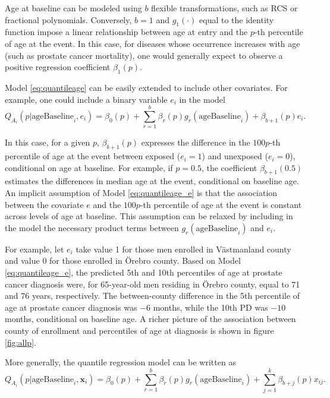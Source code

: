 Age at baseline can be modeled using $b$ flexible transformations, such as RCS or fractional polynomials. Conversely, $b=1$ and $g_1(\cdot)$ equal to the identity function impose a linear relationship between age at entry and the $p$-th percentile of age at the event. In this case, for diseases whose occurrence increases with age (such as prostate cancer mortality), one would generally expect to observe a positive regression coefficient $\beta_1(p)$.

Model \ref{eq:quantileage} can be easily extended to include other covariates. For example, one could include a binary variable $e_i$ in the model
\begin{equation}
Q_{A_i}(p|\textrm{ageBaseline}_i, e_i) = \beta_0(p) + \sum_{r=1}^b \beta_r(p)g_r(\textrm{ageBaseline}_i) + \beta_{b+1}(p)e_i.
\label{eq:quantileage_e}
\end{equation}

In this case, for a given $p$, $\beta_{b+1}(p)$ expresses the difference in the $100p$-th percentile of age at the event between exposed ($e_i=1$) and unexposed ($e_i=0$), conditional on age at baseline. For example, if $p=0.5$, the coefficient $\beta_{b+1}(0.5)$ estimates the differences in median age at the event, conditional on baseline age. An implicit assumption of Model \ref{eq:quantileage_e} is that the association between the covariate $e$ and the $100p$-th percentile of age at the event is constant across levels of age at baseline. This assumption can be relaxed by including in the model the necessary product terms between $g_r(\textrm{ageBaseline}_i)$ and $e_i$.

For example, let $e_i$ take value 1 for those men enrolled in Västmanland county and value 0 for those enrolled in Örebro county. Based on Model \ref{eq:quantileage_e}, the predicted 5th and 10th percentiles of age at prostate cancer diagnosis were, for 65-year-old men residing in Örebro county, equal to 71 and 76 years, respectively. The between-county difference in the 5th percentile of age at prostate cancer diagnosis was $-6$ months, while the 10th PD was $-10$ months, conditional on baseline age. A richer picture of the association between county of enrollment and percentiles of age at diagnosis is shown in figure \ref{fig:allp}.

More generally, the quantile regression model can be written as 
\begin{equation}
Q_{A_i}(p|\textrm{ageBaseline}_i, \mathbf{x}_i) = \beta_0(p) + \sum_{r=1}^b \beta_r(p)g_r(\textrm{ageBaseline}_i) + \sum_{j=1}^k \beta_{b+j}(p)x_{ij}.
\label{eq:quantileage_ex}
\end{equation}

